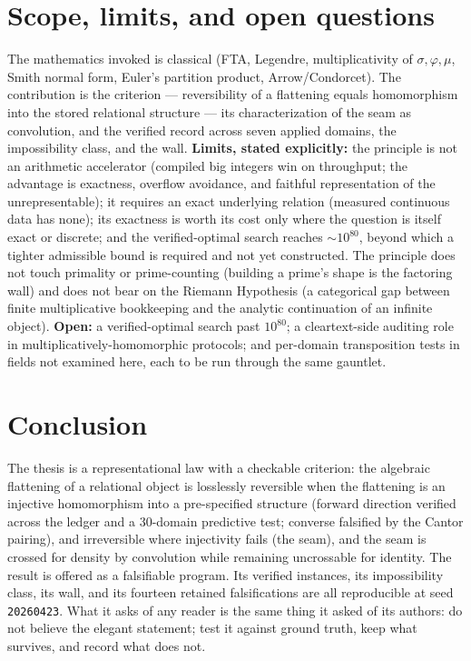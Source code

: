 \documentclass[11pt]{article}
\begin{document}
\section{Scope, limits, and open questions}

The mathematics invoked is classical (FTA, Legendre, multiplicativity of $\sigma,\varphi,\mu$, Smith normal
form, Euler's partition product, Arrow/Condorcet). The contribution is the criterion --- reversibility of a
flattening equals homomorphism into the stored relational structure --- its characterization of the seam as
convolution, and the verified record across seven applied domains, the impossibility class, and the wall.
\textbf{Limits, stated explicitly:} the principle is not an arithmetic accelerator (compiled big integers win
on throughput; the advantage is exactness, overflow avoidance, and faithful representation of the
unrepresentable); it requires an exact underlying relation (measured continuous data has none); its exactness
is worth its cost only where the question is itself exact or discrete; and the verified-optimal search reaches
$\sim\!10^{80}$, beyond which a tighter admissible bound is required and not yet constructed. The principle
does not touch primality or prime-counting (building a prime's shape is the factoring wall) and does not bear
on the Riemann Hypothesis (a categorical gap between finite multiplicative bookkeeping and the analytic
continuation of an infinite object). \textbf{Open:} a verified-optimal search past $10^{80}$; a
cleartext-side auditing role in multiplicatively-homomorphic protocols; and per-domain transposition tests in
fields not examined here, each to be run through the same gauntlet.

\section{Conclusion}

The thesis is a representational law with a checkable criterion: the algebraic flattening of a relational
object is losslessly reversible when the flattening is an injective homomorphism into a pre-specified structure (forward direction verified across the ledger and a $30$-domain predictive test; converse falsified by the Cantor pairing), and irreversible where injectivity fails (the seam),
and the seam is crossed for density by convolution while remaining uncrossable for identity. The result is offered
as a falsifiable program. Its verified instances, its impossibility class, its wall, and its fourteen retained
falsifications are all reproducible at seed \texttt{20260423}. What it asks of any reader is the same thing it
asked of its authors: do not believe the elegant statement; test it against ground truth, keep what survives,
and record what does not.
\end{document}

